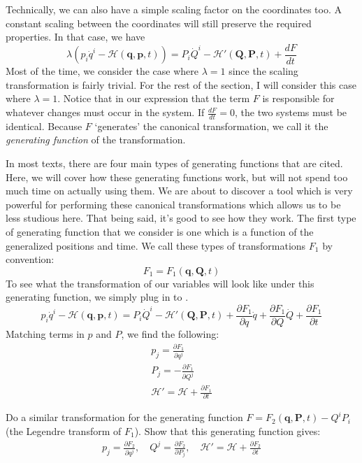 Technically, we can also have a simple scaling factor on the coordinates too. A constant scaling between the coordinates will still preserve the required properties. In that case, we have
$$\lambda \left(p_i\dot{q}^i-\mathcal{H}(\bm{q},\bm{p},t)\right)=P_i\dot{Q}^i-\mathcal{H}'(\bm{Q},\bm{P},t)+\frac{dF}{dt}$$
Most of the time, we consider the case where $\lambda=1$ since the scaling transformation is fairly trivial. For the rest of the section, I will consider this case where $\lambda=1$. Notice that in our expression that the term $F$ is responsible for whatever changes must occur in the system. If $\frac{dF}{dt}=0$, the two systems must be identical. Because $F$ `generates' the canonical transformation, we call it the \textit{generating function} of the transformation.

In most texts, there are four main types of generating functions that are cited. Here, we will cover how these generating functions work, but will not spend too much time on actually using them. We are about to discover a tool which is very powerful for performing these canonical transformations which allows us to be less studious here. That being said, it's good to see how they work. The first type of generating function that we consider is one which is a function of the generalized positions and time. We call these types of transformations $F_1$ by convention:
$$F_1=F_1(\bm{q},\bm{Q},t)$$
To see what the transformation of our variables will look like under this generating function, we simply plug in to .
$$p_i\dot{q}^i-\mathcal{H}(\bm{q},\bm{p},t)=P_i\dot{Q}^i-\mathcal{H}'(\bm{Q},\bm{P},t)+\frac{\partial F_1}{\partial q}\dot{q}+\frac{\partial F_1}{\partial Q}\dot{Q}+\frac{\partial F_1}{\partial t}$$
Matching terms in $p$ and $P$, we find the following:
\begin{gather}
p_j=\frac{\partial F_1}{\partial q^j}\\
P_j=-\frac{\partial F_1}{\partial Q^j}\\
\mathcal{H}'=\mathcal{H}+\frac{\partial F_1}{\partial t}
\end{gather}
 \begin{exercise}
Do a similar transformation for the generating function $F=F_2(\bm{q},\bm{P},t)-Q^iP_i$ (the Legendre transform of $F_1$). Show that this generating function gives:
\begin{gather}
p_j=\frac{\partial F_2}{\partial q^j},\quad Q^j=\frac{\partial F_2}{\partial P_j}, \quad \mathcal{H}'=\mathcal{H}+\frac{\partial F_2}{\partial t}
\end{gather}
 \end{exercise}

